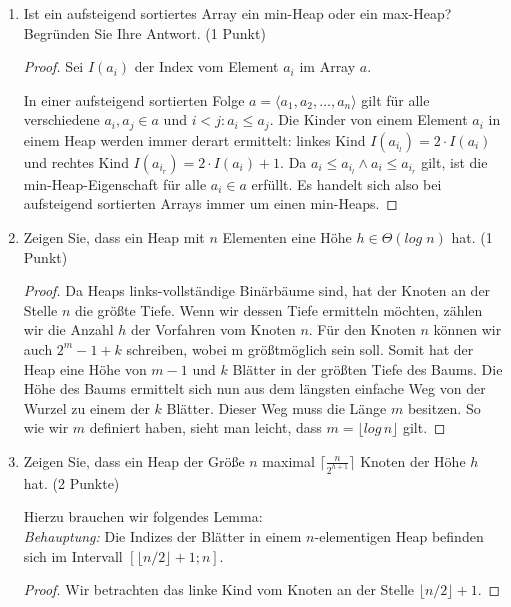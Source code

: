 \documentclass[ngerman,landscape,twocolumn]{adtexsheet}
\begin{document}
\begin{question}
    \begin{enumerate}
    \item Ist ein aufsteigend sortiertes Array ein min-Heap oder ein max-Heap? Begründen Sie Ihre Antwort. (1 Punkt)
    \begin{proof}
        Sei $I(a_i)$ der Index vom Element $a_i$ im Array $a$.
        
        In einer aufsteigend sortierten Folge $a = \langle a_1, a_2, \ldots, a_n \rangle$ gilt für alle verschiedene $a_i, a_j \in a$ und $i < j : a_i \leq a_j$. Die Kinder von einem Element $a_i$ in einem Heap werden immer derart ermittelt: linkes Kind $ I(a_{i_l})= 2 \cdot I(a_i)$ und rechtes Kind $I(a_{i_r})= 2 \cdot I(a_i)+ 1$. Da $a_i \leq a_{i_l} \land a_i \leq a_{i_r}$ gilt, ist die min-Heap-Eigenschaft für alle $a_i \in a$ erfüllt. Es handelt sich also bei aufsteigend sortierten Arrays immer um einen min-Heaps.
    \end{proof}
    
    \item Zeigen Sie, dass ein Heap mit $n$ Elementen eine Höhe $h \in \Theta(log \; n)$ hat. (1 Punkt)
    \begin{proof}
        Da Heaps links-vollständige Binärbäume sind, hat der Knoten an der Stelle $n$ die größte Tiefe. Wenn wir dessen Tiefe ermitteln möchten, zählen wir die Anzahl $h$ der Vorfahren vom Knoten $n$.
        Für den Knoten $n$ können wir auch $2^m-1 + k$ schreiben, wobei m größtmöglich sein soll.
        Somit hat der Heap eine Höhe von $m-1$ und $k$ Blätter in der größten Tiefe des Baums.
        Die Höhe des Baums ermittelt sich nun aus dem längsten einfache Weg von der Wurzel zu einem der $k$ Blätter. Dieser Weg muss die Länge $m$ besitzen. So wie wir $m$ definiert haben, sieht man leicht, dass $m= \lfloor log\,n \rfloor$ gilt.
    \end{proof}

    \item Zeigen Sie, dass ein Heap der Größe $n$ maximal $\lceil \frac{n}{2^{h+1}} \rceil$ Knoten der Höhe $h$ hat. (2 Punkte)
    
        Hierzu brauchen wir folgendes Lemma:\\
        \emph{Behauptung:} Die Indizes der Blätter in einem $n$-elementigen Heap befinden sich im Intervall $\left[\lfloor n/2 \rfloor+1; n\right]$.
        \begin{proof}
        Wir betrachten das linke Kind vom Knoten an der Stelle $\lfloor n/2 \rfloor + 1$.
        

\end{proof}
\end{enumerate}
\end{question}
\end{document}
